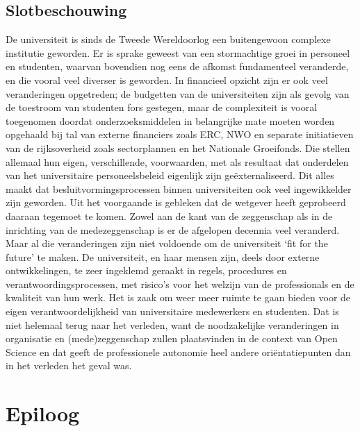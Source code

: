 \documentclass{jote-book}
\begin{document}
	\section{Slotbeschouwing}



	De universiteit is sinds de Tweede Wereldoorlog een buitengewoon complexe institutie geworden. Er is sprake geweest van een stormachtige groei in personeel en studenten, waarvan bovendien nog eens de afkomst fundamenteel veranderde, en die vooral veel diverser is geworden. In financieel opzicht zijn er ook veel veranderingen opgetreden; de budgetten van de universiteiten zijn als gevolg van de toestroom van studenten fors gestegen, maar de complexiteit is vooral toegenomen doordat onderzoeksmiddelen in belangrijke mate moeten worden opgehaald bij tal van externe financiers zoals ERC, NWO en separate initiatieven van de rijksoverheid zoals sectorplannen en het Nationale Groeifonds. Die stellen allemaal hun eigen, verschillende, voorwaarden, met als resultaat dat onderdelen van het universitaire personeelsbeleid eigenlijk zijn geëxternaliseerd. Dit alles maakt dat besluitvormingsprocessen binnen universiteiten ook veel ingewikkelder zijn geworden. Uit het voorgaande is gebleken dat de wetgever heeft geprobeerd daaraan tegemoet te komen. Zowel aan de kant van de zeggenschap als in de inrichting van de medezeggenschap is er de afgelopen decennia veel veranderd. Maar al die veranderingen zijn niet voldoende om de universiteit ‘fit for the future' te maken. De universiteit, en haar mensen zijn, deels door externe ontwikkelingen, te zeer ingeklemd geraakt in regels, procedures en verantwoordingsprocessen, met risico's voor het welzijn van de professionals en de kwaliteit van hun werk. Het is zaak om weer meer ruimte te gaan bieden voor de eigen verantwoordelijkheid van universitaire medewerkers en studenten. Dat is niet helemaal terug naar het verleden, want de noodzakelijke veranderingen in organisatie en (mede)zeggenschap zullen plaatsvinden in de context van Open Science en dat geeft de professionele autonomie heel andere oriëntatiepunten dan in het verleden het geval was.







	\chapter{Epiloog}
\end{document}
